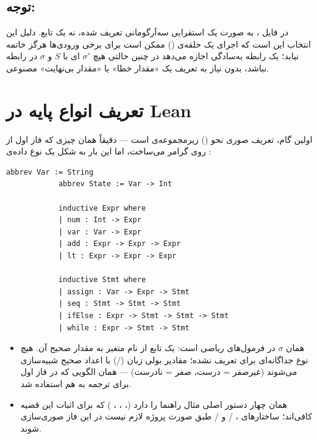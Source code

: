 \documentclass[12pt]{report}
\begin{document}
	\subsection*{توجه:}
	در فایل ،  به صورت یک  استقرایی سه‌آرگومانی تعریف شده، نه یک تابع. دلیل این انتخاب این است که اجرای یک حلقه‌ی  () ممکن است برای برخی ورودی‌ها هرگز خاتمه نیابد؛ یک رابطه به‌سادگی اجازه می‌دهد در چنین حالتی هیچ $\sigma'$ ای با $S$ و $\sigma$ در رابطه نباشد، بدون نیاز به تعریف یک «مقدار خطا» یا «مقدار بی‌نهایت» مصنوعی.
	
	\section{تعریف انواع پایه در Lean}
	
	اولین گام، تعریف صوری نحو () زیرمجموعه‌ی  است --- دقیقاً همان چیزی که  فاز اول از روی گرامر  می‌ساخت، اما این‌ بار به شکل یک نوع داده‌ی :
	
	\begin{latin}
		\begin{lstlisting}[style=leanstyle]
			abbrev Var := String
			abbrev State := Var -> Int
			
			inductive Expr where
			| num : Int -> Expr
			| var : Var -> Expr
			| add : Expr -> Expr -> Expr
			| lt : Expr -> Expr -> Expr
			
			inductive Stmt where
			| assign : Var -> Expr -> Stmt
			| seq : Stmt -> Stmt -> Stmt
			| ifElse : Expr -> Stmt -> Stmt -> Stmt
			| while : Expr -> Stmt -> Stmt
		\end{lstlisting}
	\end{latin}
	
	\begin{itemize}
		\item {} همان $\sigma$ در فرمول‌های ریاضی است: یک تابع از نام متغیر به مقدار صحیح آن. هیچ نوع جداگانه‌ای برای  تعریف نشده؛ مقادیر بولی زبان  (/) با اعداد صحیح شبیه‌سازی می‌شوند (غیرصفر = درست، صفر = نادرست) --- همان الگویی که در فاز اول برای ترجمه به  هم استفاده شد.
		\item {} همان چهار دستور اصلی مثال راهنما را دارد (، ، ، ) که برای اثبات این قضیه کافی‌اند؛ ساختارهای ، / و / طبق صورت پروژه لازم نیست در این فاز صوری‌سازی شوند.
	\end{itemize}
	
\end{document}
